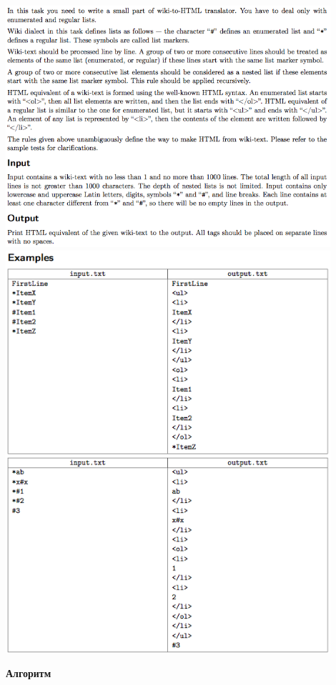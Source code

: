 \documentclass[a4paper,12pt]{article}
\begin{document}
\begin{center}
\includegraphics[width=0.9\textwidth]{CT_S02E05/CT_S02E05_K1.png}\\ [1cm]
\includegraphics[width=0.9\textwidth]{CT_S02E05/CT_S02E05_K2.png}\\ [1cm]
\end{center}

\textbf{{\large Алгоритм}}
\end{document}

